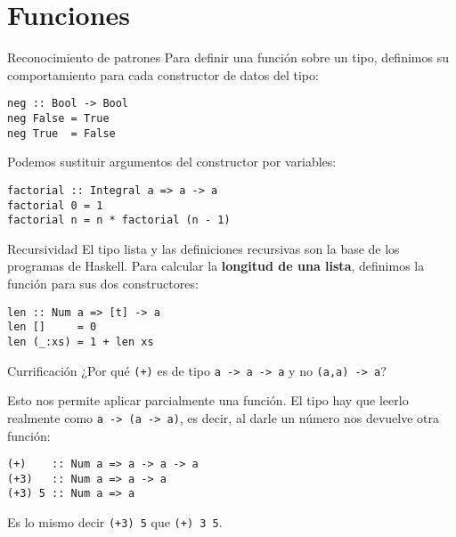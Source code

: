 \section{Funciones}

\begin{frame}[fragile]{Reconocimiento de patrones}
  Para definir una función sobre un tipo, definimos su comportamiento para cada
  constructor de datos del tipo:
  \begin{lstlisting}
neg :: Bool -> Bool
neg False = True
neg True  = False
  \end{lstlisting}

  \espacio

  Podemos sustituir argumentos del constructor por variables:
  \begin{lstlisting}
factorial :: Integral a => a -> a
factorial 0 = 1
factorial n = n * factorial (n - 1)
  \end{lstlisting}
\end{frame}

\begin{frame}[fragile]{Recursividad}
  El tipo lista y las definiciones recursivas son la base de los programas de Haskell.
  Para calcular la \textbf{longitud de una lista}, definimos la función para sus dos
  constructores:

  \espacio

  \begin{lstlisting}
len :: Num a => [t] -> a
len []     = 0
len (_:xs) = 1 + len xs
  \end{lstlisting}

\end{frame}

\begin{frame}[fragile]{Currificación}
  ¿Por qué \texttt{(+)} es de tipo \texttt{\alert{a -> a} -> a}
  y no \texttt{\alert{(a,a)} -> a}?

  \espacio

  Esto nos permite aplicar parcialmente una función. El tipo hay que leerlo realmente como
  \texttt{a -> (a -> a)}, es decir, al darle un número nos devuelve otra función:
    \begin{lstlisting}
(+)    :: Num a => a -> a -> a
(+3)   :: Num a => a -> a
(+3) 5 :: Num a => a
  \end{lstlisting}
  Es lo mismo decir \texttt{(+3) 5} que \texttt{(+) 3 5}.
\end{frame}



